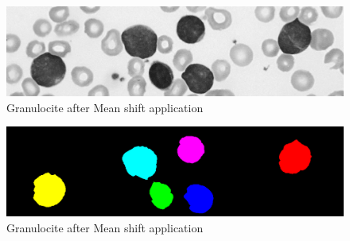 \bigskip
\begin{figure}
\begin{center}
		\includegraphics[scale=0.3]{img/final/nooverlap.png}
		\caption{Granulocite after Mean shift application}
		\label{fig:noover}
\end{center}
\end{figure}
\begin{figure}
\begin{center}
		\includegraphics[scale=0.3]{img/final/nooverlapseg.png}
		\caption{Granulocite after Mean shift application}
		\label{fig:nooverseg}
\end{center}
\end{figure}

